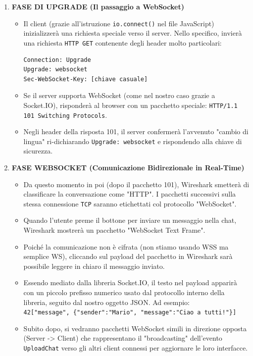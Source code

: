 \documentclass[11pt]{article}
\begin{document}
\begin{tcolorbox}[colback=green!5!white,colframe=green!75!black,title=\textbf{RISPOSTA}, breakable]
\begin{enumerate}
    \item \textbf{FASE DI UPGRADE (Il passaggio a WebSocket)}
    \begin{itemize}
        \item Il client (grazie all'istruzione \texttt{io.connect()} nel file JavaScript) inizializzerà una richiesta speciale verso il server. Nello specifico, invierà una richiesta \texttt{HTTP GET} contenente degli header molto particolari:
        \begin{verbatim}
Connection: Upgrade
Upgrade: websocket
Sec-WebSocket-Key: [chiave casuale]
        \end{verbatim}
        \item Se il server supporta WebSocket (come nel nostro caso grazie a Socket.IO), risponderà al browser con un pacchetto speciale: \texttt{HTTP/1.1 101 Switching Protocols}.
        \item Negli header della risposta 101, il server confermerà l'avvenuto "cambio di lingua" ri-dichiarando \texttt{Upgrade: websocket} e rispondendo alla chiave di sicurezza.
    \end{itemize}

    \item \textbf{FASE WEBSOCKET (Comunicazione Bidirezionale in Real-Time)}
    \begin{itemize}
        \item Da questo momento in poi (dopo il pacchetto 101), Wireshark smetterà di classificare la conversazione come "HTTP". I pacchetti successivi sulla stessa connessione \texttt{TCP} saranno etichettati col protocollo "WebSocket".
        \item Quando l'utente preme il bottone per inviare un messaggio nella chat, Wireshark mostrerà un pacchetto "WebSocket Text Frame".
        \item Poiché la comunicazione non è cifrata (non stiamo usando WSS ma semplice WS), cliccando sul payload del pacchetto in Wireshark sarà possibile leggere in chiaro il messaggio inviato.
        \item Essendo mediato dalla libreria Socket.IO, il testo nel payload apparirà con un piccolo prefisso numerico usato dal protocollo interno della libreria, seguito dal nostro oggetto JSON. Ad esempio:\\
        \texttt{42["message", \{"sender":"Mario", "message":"Ciao a tutti!"\}]}
        \item Subito dopo, si vedranno pacchetti WebSocket simili in direzione opposta (Server -> Client) che rappresentano il "broadcasting" dell'evento \texttt{UploadChat} verso gli altri client connessi per aggiornare le loro interfacce.
    \end{itemize}
\end{enumerate}


\end{tcolorbox}
\end{document}
